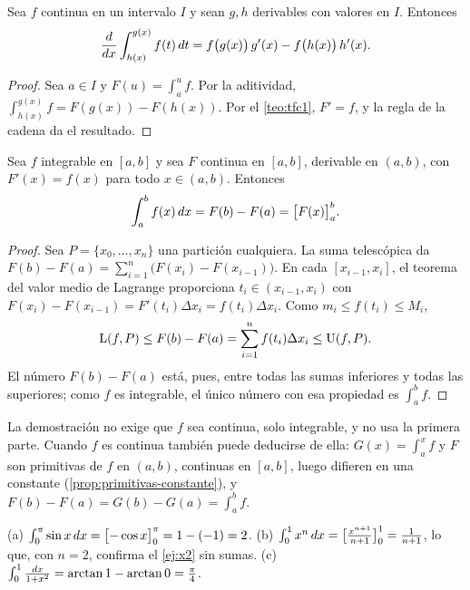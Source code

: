 \begin{corolario}\label{cor:leibniz}
Sea $f$ continua en un intervalo $I$ y sean $g,h$ derivables con valores en $I$. Entonces
\[
\frac{d}{dx}\int_{h(x)}^{g(x)}f(t)\mathop{}\!d t=f\bigl(g(x)\bigr)\,g'(x)-f\bigl(h(x)\bigr)\,h'(x).
\]
\end{corolario}

\begin{proof}
Sea $a\in I$ y $F(u)=\int_a^u f$. Por la aditividad, $\int_{h(x)}^{g(x)}f=F(g(x))-F(h(x))$. Por el \cref{teo:tfc1}, $F'=f$, y la regla de la cadena da el resultado.
\end{proof}

\begin{teorema}\label{teo:barrow}
Sea $f$ integrable en $[a,b]$ y sea $F$ continua en $[a,b]$, derivable en $(a,b)$, con $F'(x)=f(x)$ para todo $x\in(a,b)$. Entonces
\[
\int_a^b f(x)\mathop{}\!d x=F(b)-F(a)=\bigl[F(x)\bigr]_{a}^{b}.
\]
\end{teorema}

\begin{proof}
Sea $P=\{x_0,\dots,x_n\}$ una partición cualquiera. La suma telescópica da $F(b)-F(a)=\sum_{i=1}^{n}\bigl(F(x_i)-F(x_{i-1})\bigr)$. En cada $[x_{i-1},x_i]$, el teorema del valor medio de Lagrange proporciona $t_i\in(x_{i-1},x_i)$ con $F(x_i)-F(x_{i-1})=F'(t_i)\Delta x_i=f(t_i)\Delta x_i$. Como $m_i\le f(t_i)\le M_i$,
\[
\operatorname{L}(f,P)\le F(b)-F(a)=\sum_{i=1}^{n}f(t_i)\Delta x_i\le\operatorname{U}(f,P).
\]
El número $F(b)-F(a)$ está, pues, entre todas las sumas inferiores y todas las superiores; como $f$ es integrable, el único número con esa propiedad es $\int_a^b f$.
\end{proof}

La demostración no exige que $f$ sea continua, solo integrable, y no usa la primera parte. Cuando $f$ es continua también puede deducirse de ella: $G(x)=\int_a^x f$ y $F$ son primitivas de $f$ en $(a,b)$, continuas en $[a,b]$, luego difieren en una constante (\cref{prop:primitivas-constante}), y $F(b)-F(a)=G(b)-G(a)=\int_a^b f$.

\begin{ejemplo}\label{ej:barrow}
(a) $\int_0^{\pi}\sin x\mathop{}\!d x=\bigl[-\cos x\bigr]_{0}^{\pi}=1-(-1)=2$. (b) $\int_0^1x^{n}\mathop{}\!d x=\bigl[\frac{x^{n+1}}{n+1}\bigr]_{0}^{1}=\frac{1}{n+1}$, lo que, con $n=2$, confirma el \cref{ej:x2} sin sumas. (c) $\int_0^1\frac{\mathop{}\!d x}{1+x^{2}}=\arctan1-\arctan0=\frac\pi4$.
\end{ejemplo}

